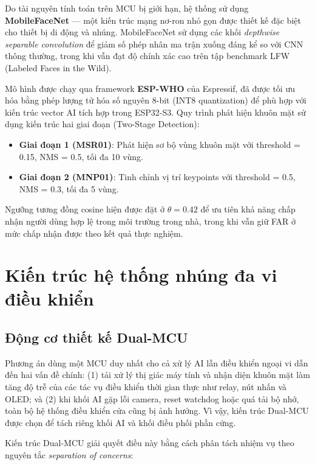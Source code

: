 Do tài nguyên tính toán trên MCU bị giới hạn, hệ thống sử dụng \textbf{MobileFaceNet} \cite{chen2018} --- một kiến trúc mạng nơ-ron nhỏ gọn được thiết kế đặc biệt cho thiết bị di động và nhúng. MobileFaceNet sử dụng các khối \textit{depthwise separable convolution} để giảm số phép nhân ma trận xuống đáng kể so với CNN thông thường, trong khi vẫn đạt độ chính xác cao trên tập benchmark LFW (Labeled Faces in the Wild).

Mô hình được chạy qua framework \textbf{ESP-WHO} của Espressif, đã được tối ưu hóa bằng phép lượng tử hóa số nguyên 8-bit (INT8 quantization) để phù hợp với kiến trúc vector AI tích hợp trong ESP32-S3. Quy trình phát hiện khuôn mặt sử dụng kiến trúc hai giai đoạn (Two-Stage Detection): 
\begin{itemize}
  \item \textbf{Giai đoạn 1 (MSR01)}: Phát hiện sơ bộ vùng khuôn mặt với threshold = 0.15, NMS = 0.5, tối đa 10 vùng.
  \item \textbf{Giai đoạn 2 (MNP01)}: Tinh chỉnh vị trí keypoints với threshold = 0.5, NMS = 0.3, tối đa 5 vùng.
\end{itemize}
Ngưỡng tương đồng cosine hiện được đặt ở $\theta = 0.42$ để ưu tiên khả năng chấp nhận người dùng hợp lệ trong môi trường trong nhà, trong khi vẫn giữ FAR ở mức chấp nhận được theo kết quả thực nghiệm.

\section{Kiến trúc hệ thống nhúng đa vi điều khiển}
\label{sec:dual_mcu}

\subsection{Động cơ thiết kế Dual-MCU}

Phương án dùng một MCU duy nhất cho cả xử lý AI lẫn điều khiển ngoại vi dẫn đến hai vấn đề chính: (1) tải xử lý thị giác máy tính và nhận diện khuôn mặt làm tăng độ trễ của các tác vụ điều khiển thời gian thực như relay, nút nhấn và OLED; và (2) khi khối AI gặp lỗi camera, reset watchdog hoặc quá tải bộ nhớ, toàn bộ hệ thống điều khiển cửa cũng bị ảnh hưởng. Vì vậy, kiến trúc Dual-MCU được chọn để tách riêng khối AI và khối điều phối phần cứng.

Kiến trúc Dual-MCU giải quyết điều này bằng cách phân tách nhiệm vụ theo nguyên tắc \textit{separation of concerns}:

